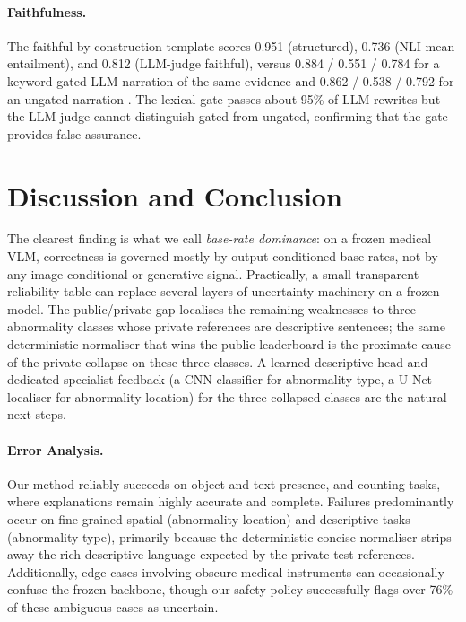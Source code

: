 \documentclass{ceurart}
\begin{document}
\paragraph{Faithfulness.}
The faithful-by-construction template scores 0.951 (structured),
0.736 (NLI mean-entailment), and 0.812 (LLM-judge faithful), versus
0.884 / 0.551 / 0.784 for a keyword-gated LLM narration of the same
evidence and 0.862 / 0.538 / 0.792 for an ungated narration
\cite{lyu2024faithful,atanasova2023faithfulness}. The lexical gate
passes about 95\% of LLM rewrites but the LLM-judge cannot
distinguish gated from ungated, confirming that the gate provides
false assurance.

\section{Discussion and Conclusion}

The clearest finding is what we call \emph{base-rate dominance}: on
a frozen medical VLM, correctness is governed mostly by
output-conditioned base rates, not by any image-conditional or
generative signal. Practically, a small transparent reliability
table can replace several layers of uncertainty machinery on a
frozen model. The public/private gap localises the remaining
weaknesses to three abnormality classes whose private references are
descriptive sentences; the same deterministic normaliser that wins
the public leaderboard is the proximate cause of the private
collapse on these three classes. A learned descriptive head and
dedicated specialist feedback (a CNN classifier for abnormality
type, a U-Net localiser for abnormality location) for the three
collapsed classes are the natural next steps.

\paragraph{Error Analysis.} Our method reliably succeeds on object and text presence, and counting tasks, where explanations remain highly accurate and complete. Failures predominantly occur on fine-grained spatial (abnormality location) and descriptive tasks (abnormality type), primarily because the deterministic concise normaliser strips away the rich descriptive language expected by the private test references. Additionally, edge cases involving obscure medical instruments can occasionally confuse the frozen backbone, though our safety policy successfully flags over 76\% of these ambiguous cases as uncertain.
\end{document}
